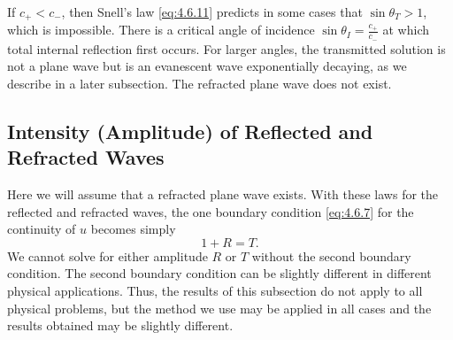 If $c_+ < c_-$, then Snell's law \eqref{eq:4.6.11} predicts in some cases that $\sin\theta_T > 1$, which is impossible.  There is a critical angle of incidence $\sin\theta_I = \frac{c_+}{c_-}$ at which total internal reflection first occurs.  For larger angles, the transmitted solution is not a plane wave but is an evanescent wave exponentially decaying, as we describe in a later subsection.  The refracted plane wave does not exist.

\subsection{Intensity (Amplitude) of Reflected and Refracted Waves}
\label{sec:intensity}

Here we will assume that a refracted plane wave exists.  With these laws for the reflected and refracted waves, the one boundary condition \eqref{eq:4.6.7} for the continuity of $u$ becomes simply
\begin{equation}
1 + R = T.
\label{eq:4.6.12}
\end{equation}
We cannot solve for either amplitude $R$ or $T$ without the second boundary condition.  The second boundary condition can be slightly different in different physical applications.  Thus, the results of this subsection do not apply to all physical problems, but the method we use may be applied in all cases and the results obtained may be slightly different.

